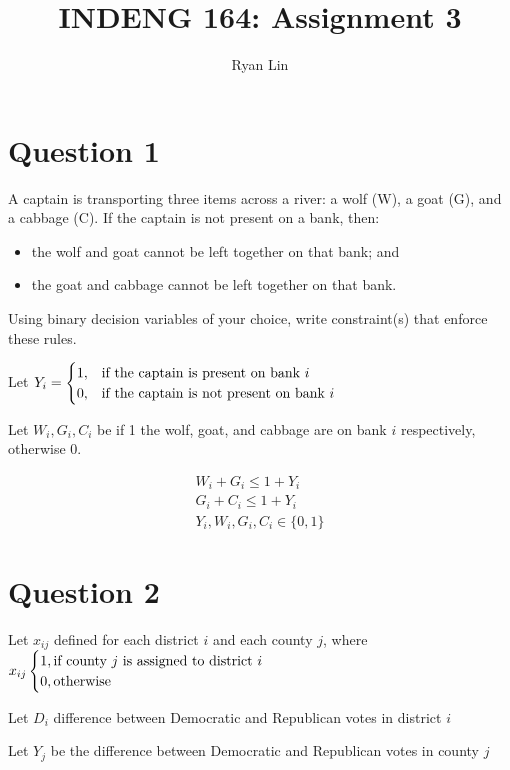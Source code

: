 \documentclass{report}
\title{INDENG 164: Assignment 3}
\author{Ryan Lin}
\date{}
\begin{document}
\maketitle
\section{Question 1}

A captain is transporting three items across a river: a wolf (W), a goat (G), and a cabbage (C).
If the captain is not present on a bank, then:

\begin{itemize}
	\item  the wolf and goat cannot be left together on that bank; and
	\item the goat and cabbage cannot be left together on that bank.
\end{itemize}
Using binary decision variables of your choice, write constraint(s) that enforce these rules.


Let $ Y_{i} = \begin{cases}
	1, & \text{if the captain is present on bank $ i $ } \\ 
	0, & \text{if the captain is not present on bank $ i $ }
\end{cases} $ 

Let $ W_{i}, G_{i}, C_{i} $ be if 1 the wolf, goat, and cabbage are on bank $ i $ respectively, otherwise 0. 

\begin{align*}
	W_{i} + G_{i} \le 1 + Y_{i} \\
	G_{i} + C_{i} \le 1 + Y_{i} \\
	Y_i, W_{i}, G_{i}, C_{i} \in \{0,1\}
\end{align*}

\newpage
\section{Question 2} 

Let $ x_{ij} $ defined for each district $ i $ and each county $ j $, where $ x_{ij} \begin{cases}
	1, \text{if county $ j $ is assigned to district $ i $ } \\
	0, \text{otherwise}
\end{cases}$

Let $ D_{i} $ difference between Democratic and Republican votes in district $ i $ 

Let $ Y_{j} $ be the difference between Democratic and Republican votes in county $ j $ 
\end{document}
